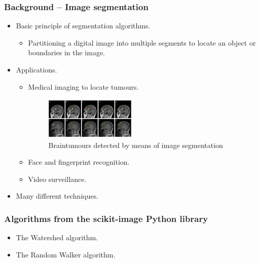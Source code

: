 \documentclass{beamer}
\newcommand{\myitem}{\item[$-$]}
\begin{document}
\begin{frame}
\frametitle{Background -- Image segmentation}
\begin{itemize}
\item Basic principle of segmentation algorithms.
\begin{itemize}
\myitem Partitioning a digital image into multiple segments to locate an object or
boundaries in the image.
\end{itemize}
\item Applications.
\begin{itemize}
\myitem Medical imaging to locate tumours.
\begin{figure}
 \centering
 \includegraphics[width=1.7in, height=0.8in]{braintumor.jpg}
 \caption{Braintumours detected by means of image segmentation}
 \end{figure}
\myitem Face and fingerprint recognition.
\myitem Video surveillance.
\end{itemize}
\item Many different techniques.
\end{itemize}
\end{frame}

\begin{frame}
\frametitle{Algorithms from the scikit-image Python library}
\begin{itemize}
\item The Watershed\cite{scikit-image} algorithm.
\item The Random Walker\cite{scikit-image} algorithm.
\end{itemize}
\end{frame}
\end{document}
